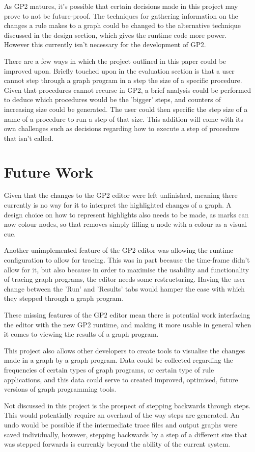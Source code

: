 \documentclass{UoYCSproject}
\begin{document}
As GP2 matures, it's possible that certain decisions made in this project may prove to not be future-proof.	The techniques for gathering information on the changes a rule makes to a graph could be changed to the alternative technique discussed in the design section, which gives the runtime code more power. However this currently isn't necessary for the development of GP2.

There are a few ways in which the project outlined in this paper could be improved upon. Briefly touched upon in the evaluation section is that a user cannot step through a graph program in a step the size of a specific procedure. Given that procedures cannot recurse in GP2, a brief analysis could be performed to deduce which procedures would be the 'bigger' steps, and counters of increasing size could be generated. The user could then specific the step size of a name of a procedure to run a step of that size. This addition will come with its own challenges such as decisions regarding how to execute a step of procedure that isn't called.

\section{Future Work}

Given that the changes to the GP2 editor were left unfinished, meaning there currently is no way for it to interpret the highlighted changes of a graph. A design choice on how to represent highlights also needs to be made, as marks can now colour nodes, so that removes simply filling a node with a colour as a visual cue.

Another unimplemented feature of the GP2 editor was allowing the runtime configuration to allow for tracing. This was in part because the time-frame didn't allow for it, but also because in order to maximise the usability and functionality of tracing graph programs, the editor needs some restructuring. Having the user change between the 'Run' and 'Results' tabs would hamper the ease with which they stepped through a graph program. 

These missing features of the GP2 editor mean there is potential work interfacing the editor with the new GP2 runtime, and making it more usable in general when it comes to viewing the results of a graph program.

This project also allows other developers to create tools to visualise the changes made in a graph by a graph program. Data could be collected regarding the frequencies of certain types of graph programs, or certain type of rule applications, and this data could serve to created improved, optimised, future versions of graph programming tools. 

Not discussed in this project is the prospect of stepping backwards through steps. This would potentially require an overhaul of the way steps are generated. An undo would be possible if the intermediate trace files and output graphs were saved individually, however, stepping backwards by a step of a different size that was stepped forwards is currently beyond the ability of the current system.


\end{document}
